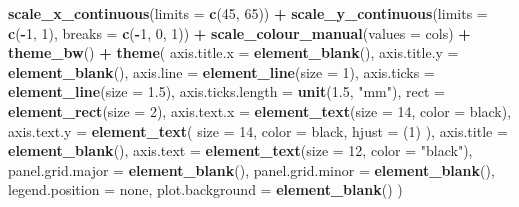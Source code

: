 \documentclass[
]{krantz}
\makeatletter
\newenvironment{Shaded}{\begin{snugshade}}{\end{snugshade}}
\newcommand{\DataTypeTok}[1]{\textcolor[rgb]{0.13,0.29,0.53}{#1}}
\newcommand{\DecValTok}[1]{\textcolor[rgb]{0.00,0.00,0.81}{#1}}
\newcommand{\FloatTok}[1]{\textcolor[rgb]{0.00,0.00,0.81}{#1}}
\newcommand{\KeywordTok}[1]{\textcolor[rgb]{0.13,0.29,0.53}{\textbf{#1}}}
\newcommand{\NormalTok}[1]{#1}
\newcommand{\OperatorTok}[1]{\textcolor[rgb]{0.81,0.36,0.00}{\textbf{#1}}}
\newcommand{\StringTok}[1]{\textcolor[rgb]{0.31,0.60,0.02}{#1}}
\newenvironment{kframe}{%
\medskip{}
\setlength{\fboxsep}{.8em}
 \def\at@end@of@kframe{}%
 \ifinner\ifhmode%
  \def\at@end@of@kframe{\end{minipage}}%
  \begin{minipage}{\columnwidth}%
 \fi\fi%
 \def\FrameCommand##1{\hskip\@totalleftmargin \hskip-\fboxsep
 \colorbox{shadecolor}{##1}\hskip-\fboxsep
     \hskip-\linewidth \hskip-\@totalleftmargin \hskip\columnwidth}%
 \MakeFramed {\advance\hsize-\width
   \@totalleftmargin\z@ \linewidth\hsize
   \@setminipage}}%
 {\par\unskip\endMakeFramed%
 \at@end@of@kframe}
\renewenvironment{Shaded}{\begin{kframe}}{\end{kframe}}
\makeatother
\begin{document}
\begin{Shaded}
\begin{Highlighting}[]
\StringTok{  }\KeywordTok{scale\_x\_continuous}\NormalTok{(}\DataTypeTok{limits =} \KeywordTok{c}\NormalTok{(}\DecValTok{45}\NormalTok{, }\DecValTok{65}\NormalTok{)) }\OperatorTok{+}
\StringTok{  }\KeywordTok{scale\_y\_continuous}\NormalTok{(}\DataTypeTok{limits =} \KeywordTok{c}\NormalTok{(}\OperatorTok{{-}}\DecValTok{1}\NormalTok{, }\DecValTok{1}\NormalTok{), }\DataTypeTok{breaks =} \KeywordTok{c}\NormalTok{(}\OperatorTok{{-}}\DecValTok{1}\NormalTok{, }\DecValTok{0}\NormalTok{, }\DecValTok{1}\NormalTok{)) }\OperatorTok{+}
\StringTok{  }\KeywordTok{scale\_colour\_manual}\NormalTok{(}\DataTypeTok{values =}\NormalTok{ cols) }\OperatorTok{+}
\StringTok{  }\KeywordTok{theme\_bw}\NormalTok{() }\OperatorTok{+}
\StringTok{  }\KeywordTok{theme}\NormalTok{(}
    \DataTypeTok{axis.title.x =} \KeywordTok{element\_blank}\NormalTok{(),}
    \DataTypeTok{axis.title.y =} \KeywordTok{element\_blank}\NormalTok{(),}
    \DataTypeTok{axis.line =} \KeywordTok{element\_line}\NormalTok{(}\DataTypeTok{size =} \DecValTok{1}\NormalTok{),}
    \DataTypeTok{axis.ticks =} \KeywordTok{element\_line}\NormalTok{(}\DataTypeTok{size =} \FloatTok{1.5}\NormalTok{),}
    \DataTypeTok{axis.ticks.length =} \KeywordTok{unit}\NormalTok{(}\FloatTok{1.5}\NormalTok{, }\StringTok{"mm"}\NormalTok{),}
    \DataTypeTok{rect =} \KeywordTok{element\_rect}\NormalTok{(}\DataTypeTok{size =} \DecValTok{2}\NormalTok{),}
    \DataTypeTok{axis.text.x =} \KeywordTok{element\_text}\NormalTok{(}\DataTypeTok{size =} \DecValTok{14}\NormalTok{, }\DataTypeTok{color =} \StringTok{\textquotesingle{}black\textquotesingle{}}\NormalTok{),}
    \DataTypeTok{axis.text.y =}
      \KeywordTok{element\_text}\NormalTok{(}
        \DataTypeTok{size =} \DecValTok{14}\NormalTok{,}
        \DataTypeTok{color =} \StringTok{\textquotesingle{}black\textquotesingle{}}\NormalTok{,}
        \DataTypeTok{hjust =}\NormalTok{ (}\DecValTok{1}\NormalTok{)}
\NormalTok{      ),}
    \DataTypeTok{axis.title =} \KeywordTok{element\_blank}\NormalTok{(),}
    \DataTypeTok{axis.text =} \KeywordTok{element\_text}\NormalTok{(}\DataTypeTok{size =} \DecValTok{12}\NormalTok{, }\DataTypeTok{color =} \StringTok{"black"}\NormalTok{),}
    \DataTypeTok{panel.grid.major =} \KeywordTok{element\_blank}\NormalTok{(),}
    \DataTypeTok{panel.grid.minor =} \KeywordTok{element\_blank}\NormalTok{(),}
    \DataTypeTok{legend.position =} \StringTok{\textquotesingle{}none\textquotesingle{}}\NormalTok{,}
    \DataTypeTok{plot.background =} \KeywordTok{element\_blank}\NormalTok{()}
\NormalTok{  )}




\end{Highlighting}
\end{Shaded}
\end{document}
